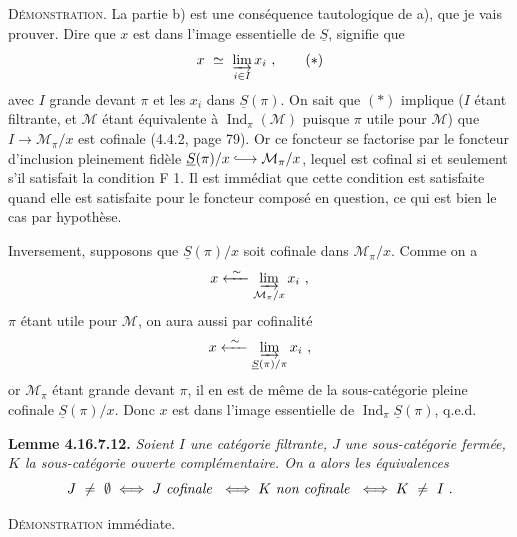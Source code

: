 \documentclass[11pt]{article}
\newcommand{\printedpage}[1]{\marginpar{\footnotesize p.~#1}}
\newcommand{\msp}[1]{\marginpar{\footnotesize [#1]}}
\newcommand{\cM}{\mathcal{M}}
\newcommand{\Ind}{\operatorname{Ind}}
\newcommand{\incl}{\lhook\joinrel\longrightarrow}
\begin{document}
\noindent\textsc{Démonstration}. La partie b) est une conséquence tautologique de a), que je vais prouver. Dire que $x$ est dans l'image essentielle de $\underline{S}$, signifie que
\[
x \ \simeq \ \varinjlim_{i\in I} x_i \ , \tag*{$(*)$}
\]
avec $I$ grande devant $\pi$ et les $x_i$ dans $\underline{S}(\pi)$. On sait que $(*)$ implique ($I$ étant filtrante, et $\cM$ étant équivalente à $\Ind_\pi(\cM)$ puisque $\pi$ utile pour $\cM$) que $I\longrightarrow\cM_\pi/x$ est cofinale (4.4.2, page 79). Or ce foncteur se factorise par le foncteur d'inclusion pleinement fidèle $\underline{S}(\pi)/x\incl\cM_\pi/x$, lequel est cofinal si et seulement s'il satisfait la condition F 1. Il est immédiat que cette condition est satisfaite quand elle est satisfaite pour le foncteur composé en question, ce qui est bien le cas
\printedpage{190}
\msp{page 490}
par hypothèse.

\noindent Inversement, supposons que $\underline{S}(\pi)/x$ soit cofinale dans $\cM_\pi/x$. Comme on a
\[
x \xleftarrow{\ \sim\ } \varinjlim_{\cM_\pi/x} x_i \ ,
\]
$\pi$ étant utile pour $\cM$, on aura aussi par cofinalité
\[
x \xleftarrow{\ \sim\ } \varinjlim_{\underline{S}(\pi)/\pi} x_i \ , %
\]
or $\cM_\pi$ étant grande devant $\pi$, il en est de même de la sous-catégorie pleine cofinale $\underline{S}(\pi)/x$. Donc $x$ est dans l'image essentielle de $\Ind_\pi\underline{S}(\pi)$, q.e.d.

\noindent\textbf{Lemme 4.16.7.12.} \textit{Soient $I$ une catégorie filtrante, $J$ une sous-catégorie fermée, $K$ la sous-catégorie ouverte complémentaire. On a alors les équivalences}
\[
J \ \neq \ \emptyset \iff J \text{ \textit{cofinale} } \iff K \text{ \textit{non cofinale} } \iff K \ \neq \ I \ .
\]

\noindent\textsc{Démonstration} immédiate.
\end{document}
